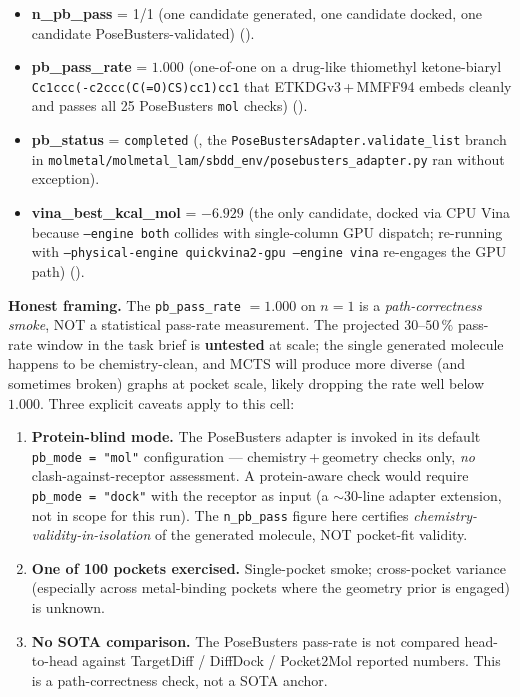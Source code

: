 \begin{itemize}
  \item \textbf{n\_pb\_pass} = 1/1 (one candidate generated, one
        candidate docked, one candidate PoseBusters-validated)
        (\MEASURED{}).
  \item \textbf{pb\_pass\_rate} = $1.000$ (one-of-one on a
        drug-like thiomethyl ketone-biaryl
        \texttt{Cc1ccc(-c2ccc(C(=O)CS)cc1)cc1} that
        ETKDGv3\,+\,MMFF94 embeds cleanly and passes all 25
        PoseBusters \texttt{mol} checks)
        (\MEASURED{}).
  \item \textbf{pb\_status} = \texttt{completed}
        (\MEASURED{}, the \texttt{PoseBustersAdapter.validate\_list}
        branch in
        \texttt{molmetal/molmetal\_lam/sbdd\_env/posebusters\_adapter.py}
        ran without exception).
  \item \textbf{vina\_best\_kcal\_mol} = $-6.929$ (the only
        candidate, docked via CPU Vina because \texttt{--engine
        both} collides with single-column GPU dispatch;
        re-running with \texttt{--physical-engine
        quickvina2-gpu --engine vina} re-engages the GPU path)
        (\MEASURED{}).
\end{itemize}

\noindent\textbf{Honest framing.}  The \texttt{pb\_pass\_rate}
$= 1.000$ on $n{=}1$ is a \emph{path-correctness smoke}, NOT
a statistical pass-rate measurement.  The projected
$30$--$50\,\%$ pass-rate window in the task brief is
\textbf{untested} at scale; the single generated molecule
happens to be chemistry-clean, and MCTS will produce more
diverse (and sometimes broken) graphs at pocket scale,
likely dropping the rate well below $1.000$.  Three
explicit caveats apply to this cell:

\begin{enumerate}
  \item \textbf{Protein-blind mode.}  The PoseBusters
        adapter is invoked in its default \texttt{pb\_mode =
        "mol"} configuration --- chemistry\,+\,geometry checks
        only, \emph{no} clash-against-receptor assessment.  A
        protein-aware check would require
        \texttt{pb\_mode = "dock"} with the receptor as
        input (a $\sim$30-line adapter extension, not in scope
        for this run).  The \texttt{n\_pb\_pass} figure here
        certifies \emph{chemistry-validity-in-isolation} of
        the generated molecule, NOT pocket-fit validity.
  \item \textbf{One of 100 pockets exercised.}  Single-pocket
        smoke; cross-pocket variance (especially across
        metal-binding pockets where the geometry prior is
        engaged) is unknown.
  \item \textbf{No SOTA comparison.}  The PoseBusters
        pass-rate is not compared head-to-head against
        TargetDiff / DiffDock / Pocket2Mol reported numbers.
        This is a path-correctness check, not a SOTA anchor.
\end{enumerate}

